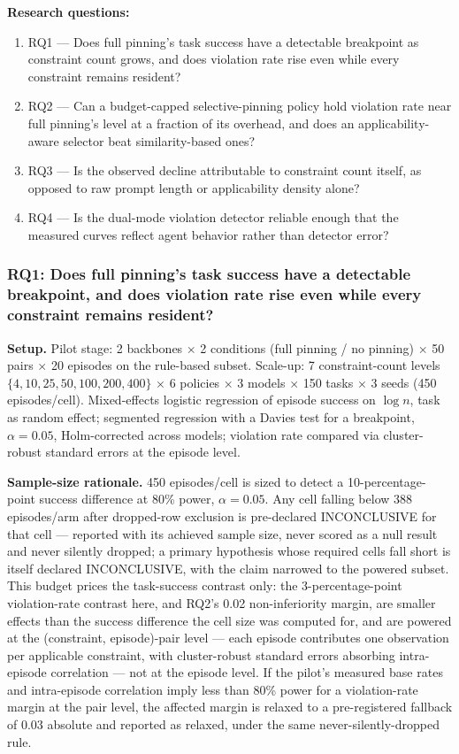 \documentclass[11pt]{article}
\begin{document}
\textbf{Research questions:}
\begin{enumerate}[leftmargin=1.6em]
\item RQ1 --- Does full pinning's task success have a detectable breakpoint as constraint count grows, and does violation rate rise even while every constraint remains resident?
\item RQ2 --- Can a budget-capped selective-pinning policy hold violation rate near full pinning's level at a fraction of its overhead, and does an applicability-aware selector beat similarity-based ones?
\item RQ3 --- Is the observed decline attributable to constraint count itself, as opposed to raw prompt length or applicability density alone?
\item RQ4 --- Is the dual-mode violation detector reliable enough that the measured curves reflect agent behavior rather than detector error?
\end{enumerate}

\subsubsection{RQ1: Does full pinning's task success have a detectable breakpoint, and does violation rate rise even while every constraint remains resident?}
\textbf{Setup.} Pilot stage: 2 backbones $\times$ 2 conditions (full pinning / no pinning) $\times$ 50 pairs $\times$ 20 episodes on the rule-based subset. Scale-up: 7 constraint-count levels $\{4, 10, 25, 50, 100, 200, 400\}$ $\times$ 6 policies $\times$ 3 models $\times$ 150 tasks $\times$ 3 seeds (450 episodes/cell). Mixed-effects logistic regression of episode success on $\log n$, task as random effect; segmented regression with a Davies test for a breakpoint, $\alpha = 0.05$, Holm-corrected across models; violation rate compared via cluster-robust standard errors at the episode level.

\textbf{Sample-size rationale.} 450 episodes/cell is sized to detect a 10-percentage-point success difference at 80\% power, $\alpha = 0.05$. Any cell falling below 388 episodes/arm after dropped-row exclusion is pre-declared INCONCLUSIVE for that cell --- reported with its achieved sample size, never scored as a null result and never silently dropped; a primary hypothesis whose required cells fall short is itself declared INCONCLUSIVE, with the claim narrowed to the powered subset. This budget prices the task-success contrast only: the 3-percentage-point violation-rate contrast here, and RQ2's 0.02 non-inferiority margin, are smaller effects than the success difference the cell size was computed for, and are powered at the (constraint, episode)-pair level --- each episode contributes one observation per applicable constraint, with cluster-robust standard errors absorbing intra-episode correlation --- not at the episode level. If the pilot's measured base rates and intra-episode correlation imply less than 80\% power for a violation-rate margin at the pair level, the affected margin is relaxed to a pre-registered fallback of 0.03 absolute and reported as relaxed, under the same never-silently-dropped rule.
\end{document}
